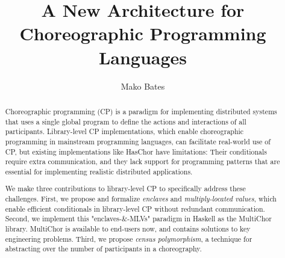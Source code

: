 \documentclass{report}
\title{A New Architecture for Choreographic Programming Languages}
\author{Mako Bates}
\newcommand{\MultiChor}{Multi\-Chor\xspace}
\begin{document}
\maketitle
\makeacceptance


\begin{abstract}
  Choreographic programming (CP) is a paradigm for implementing
  distributed systems that uses a single global program to define the
  actions and interactions of all participants.
  Library-level CP implementations, which enable choreographic programming in mainstream programming languages,
  can facilitate real-world use of CP, but existing implementations like HasChor have limitations:
  Their conditionals require extra communication,
  and they lack support for programming patterns that are essential for implementing
  realistic distributed applications.

  We make three contributions to library-level CP to specifically
  address these challenges. First, we propose and formalize
  \emph{enclaves} and \emph{multiply-located values}, which enable
  efficient conditionals in library-level CP without redundant
  communication.
  Second, we implement this "enclaves-\&-MLVs" paradigm in Haskell as the \MultiChor library.
  \MultiChor is available to end-users now,
  and contains solutions to key engineering problems.
  Third, we propose
  \emph{census polymorphism}, a technique for abstracting over the
  number of participants in a choreography.
\end{abstract}
\end{document}
